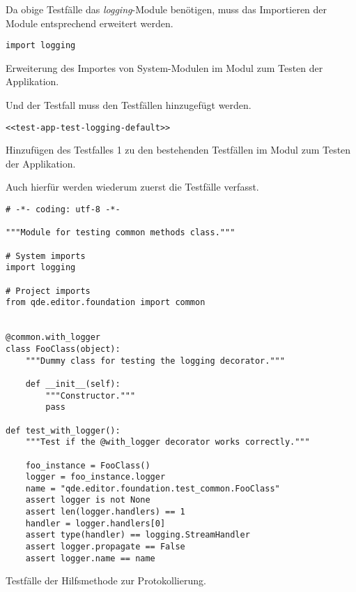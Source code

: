\documentclass[10pt, openright, notitlepage]{scrreprt}
\begin{document}
Da obige Testfälle das \emph{logging}-Module benötigen, muss das Importieren der Module
entsprechend erweitert werden.

\begin{listing}[H]
\begin{verbatim}
import logging
\end{verbatim}
\caption{\label{org493e1ff}
Erweiterung des Importes von System-Modulen im Modul zum Testen der Applikation.}
\end{listing}

Und der Testfall muss den Testfällen hinzugefügt werden.

\begin{listing}[H]
\begin{verbatim}
<<test-app-test-logging-default>>
\end{verbatim}
\caption{\label{org2ff7ef3}
Hinzufügen des Testfalles 1 zu den bestehenden Testfällen im Modul zum Testen der Applikation.}
\end{listing}

Auch hierfür werden wiederum zuerst die Testfälle verfasst.

\begin{listing}[H]
\begin{verbatim}
# -*- coding: utf-8 -*-

"""Module for testing common methods class."""

# System imports
import logging

# Project imports
from qde.editor.foundation import common


@common.with_logger
class FooClass(object):
    """Dummy class for testing the logging decorator."""

    def __init__(self):
        """Constructor."""
        pass

def test_with_logger():
    """Test if the @with_logger decorator works correctly."""

    foo_instance = FooClass()
    logger = foo_instance.logger
    name = "qde.editor.foundation.test_common.FooClass"
    assert logger is not None
    assert len(logger.handlers) == 1
    handler = logger.handlers[0]
    assert type(handler) == logging.StreamHandler
    assert logger.propagate == False
    assert logger.name == name
\end{verbatim}
\caption{\label{org0aa46fa}
Testfälle der Hilfsmethode zur Protokollierung.}
\end{listing}
\end{document}
